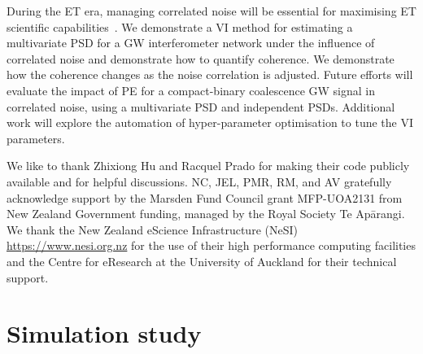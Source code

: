 \documentclass[%
 reprint,
 amsmath,amssymb,
 aps,
]{revtex4-2}
\begin{document}
During the \ac{ET} era, managing correlated noise will be essential for maximising \ac{ET} scientific capabilities~\cite{Cireddu:2023:arXiv}.
We demonstrate a VI method for estimating a multivariate PSD for a \ac{GW} interferometer network under the influence of correlated noise and demonstrate how to quantify coherence. 
We demonstrate how the coherence changes as the noise correlation is adjusted. 
Future efforts will evaluate the impact of \ac{PE} for a compact-binary coalescence \ac{GW} signal in correlated noise, using a multivariate PSD and independent PSDs. 
Additional work will explore the automation of hyper-parameter optimisation to tune the \ac{VI} parameters. 


\begin{acknowledgments}
We like to thank Zhixiong Hu and Racquel Prado for making their code publicly available and for helpful discussions. NC, JEL, PMR, RM, and AV gratefully acknowledge support  by the Marsden Fund Council grant MFP-UOA2131 from New Zealand Government funding, managed by the Royal Society Te Apārangi. We thank the New Zealand eScience Infrastructure
(NeSI) \url{https://www.nesi.org.nz} for the use of their high performance computing facilities and
the Centre for eResearch at the University of Auckland for their technical
support.
\end{acknowledgments}


\appendix  

\section{Simulation study} \label{sec:Simulation study}

\end{document}
